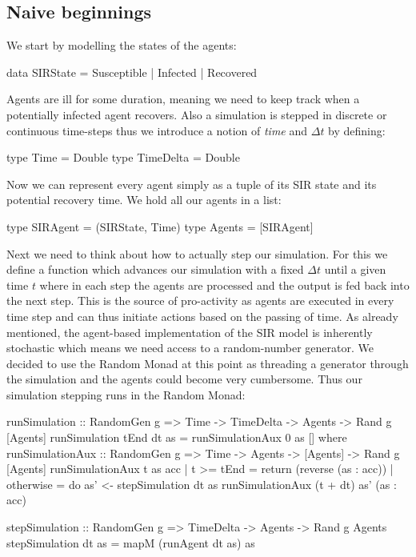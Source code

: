 \subsection{Naive beginnings}
We start by modelling the states of the agents:

\begin{HaskellCode}
data SIRState = Susceptible | Infected | Recovered
\end{HaskellCode}

Agents are ill for some duration, meaning we need to keep track when a potentially infected agent recovers. Also a simulation is stepped in discrete or continuous time-steps thus we introduce a notion of \textit{time} and $\Delta t$ by defining:

\begin{HaskellCode}
type Time      = Double
type TimeDelta = Double
\end{HaskellCode}

Now we can represent every agent simply as a tuple of its SIR state and its potential recovery time. We hold all our agents in a list:
\begin{HaskellCode}
type SIRAgent = (SIRState, Time)
type Agents   = [SIRAgent]
\end{HaskellCode}

Next we need to think about how to actually step our simulation. For this we define a function which advances our simulation with a fixed $\Delta t$ until a given time $t$ where in each step the agents are processed and the output is fed back into the next step. This is the source of pro-activity as agents are executed in every time step and can thus initiate actions based on the passing of time.
As already mentioned, the agent-based implementation of the SIR model is inherently stochastic which means we need access to a random-number generator. We decided to use the Random Monad at this point as threading a generator through the simulation and the agents could become very cumbersome. Thus our simulation stepping runs in the Random Monad:

\begin{HaskellCode}
runSimulation :: RandomGen g 
  => Time -> TimeDelta -> Agents -> Rand g [Agents]
runSimulation tEnd dt as = runSimulationAux 0 as []
  where
    runSimulationAux :: RandomGen g 
      => Time -> Agents -> [Agents] -> Rand g [Agents]
    runSimulationAux t as acc
      | t >= tEnd = return (reverse (as : acc))
      | otherwise = do
        as' <- stepSimulation dt as 
        runSimulationAux (t + dt) as' (as : acc)

stepSimulation :: RandomGen g 
  => TimeDelta -> Agents -> Rand g Agents
stepSimulation dt as = mapM (runAgent dt as) as
\end{HaskellCode}

